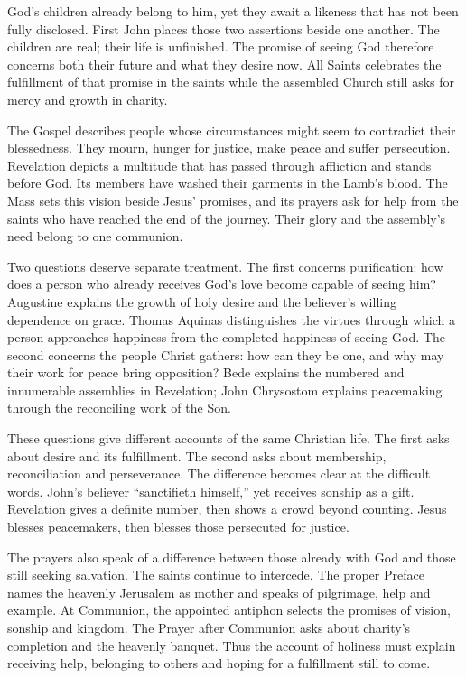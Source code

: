 God's children already belong to him, yet they await a likeness that has not been fully disclosed. First John places those two assertions beside one another. The children are real; their life is unfinished. The promise of seeing God therefore concerns both their future and what they desire now. All Saints celebrates the fulfillment of that promise in the saints while the assembled Church still asks for mercy and growth in charity.

The Gospel describes people whose circumstances might seem to contradict their blessedness. They mourn, hunger for justice, make peace and suffer persecution. Revelation depicts a multitude that has passed through affliction and stands before God. Its members have washed their garments in the Lamb's blood. The Mass sets this vision beside Jesus' promises, and its prayers ask for help from the saints who have reached the end of the journey. Their glory and the assembly's need belong to one communion.

Two questions deserve separate treatment. The first concerns purification: how does a person who already receives God's love become capable of seeing him? Augustine explains the growth of holy desire and the believer's willing dependence on grace. Thomas Aquinas distinguishes the virtues through which a person approaches happiness from the completed happiness of seeing God. The second concerns the people Christ gathers: how can they be one, and why may their work for peace bring opposition? Bede explains the numbered and innumerable assemblies in Revelation; John Chrysostom explains peacemaking through the reconciling work of the Son.

These questions give different accounts of the same Christian life. The first asks about desire and its fulfillment. The second asks about membership, reconciliation and perseverance. The difference becomes clear at the difficult words. John's believer ``sanctifieth himself,'' yet receives sonship as a gift. Revelation gives a definite number, then shows a crowd beyond counting. Jesus blesses peacemakers, then blesses those persecuted for justice.

The prayers also speak of a difference between those already with God and those still seeking salvation. The saints continue to intercede. The proper Preface names the heavenly Jerusalem as mother and speaks of pilgrimage, help and example. At Communion, the appointed antiphon selects the promises of vision, sonship and kingdom. The Prayer after Communion asks about charity's completion and the heavenly banquet. Thus the account of holiness must explain receiving help, belonging to others and hoping for a fulfillment still to come.


